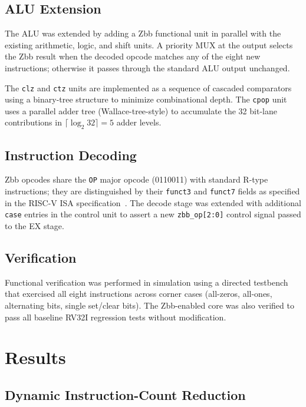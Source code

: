 \documentclass[conference]{IEEEtran}
\begin{document}
	\subsection{ALU Extension}
	
	The ALU was extended by adding a Zbb functional unit in parallel with the
	existing arithmetic, logic, and shift units.
	A priority MUX at the output selects the Zbb result when the decoded opcode
	matches any of the eight new instructions; otherwise it passes through the
	standard ALU output unchanged.
	
	The \texttt{clz} and \texttt{ctz} units are implemented as a sequence of
	cascaded comparators using a binary-tree structure to minimize combinational
	depth.
	The \texttt{cpop} unit uses a parallel adder tree (Wallace-tree-style)
	to accumulate the 32 bit-lane contributions in $\lceil\log_2 32\rceil = 5$
	adder levels.
	
	\subsection{Instruction Decoding}
	
	Zbb opcodes share the \texttt{OP} major opcode (0110011) with standard
	R-type instructions; they are distinguished by their \texttt{funct3} and
	\texttt{funct7} fields as specified in the RISC-V ISA specification~\cite{riscv-isa}.
	The decode stage was extended with additional \texttt{case} entries in the
	control unit to assert a new \texttt{zbb\_op[2:0]} control signal passed
	to the EX stage.
	
	\subsection{Verification}
	
	Functional verification was performed in simulation using a directed
	testbench that exercised all eight instructions across corner cases
	(all-zeros, all-ones, alternating bits, single set/clear bits).
	The Zbb-enabled core was also verified to pass all baseline RV32I
	regression tests without modification.
	
	\section{Results}
	\label{sec:results}
	
	\subsection{Dynamic Instruction-Count Reduction}
	
\end{document}
